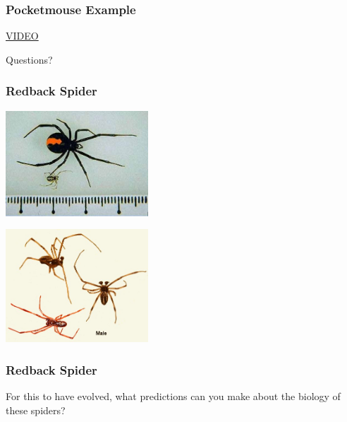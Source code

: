\documentclass[10pt]{beamer}
\begin{document}
\begin{frame}
\frametitle{Pocketmouse Example}

	\begin{center}
		\href{https://www.youtube.com/watch?v=sjeSEngKGrg}{\LARGE{VIDEO}}
	\end{center}
\end{frame}


\begin{frame}
	\begin{center}
		\textcolor{myblue}{\LARGE{Questions?}}
	\end{center}	
\end{frame}    


\begin{frame}
\frametitle{Redback Spider}

	\begin{center}
		\includegraphics[width=0.4\textwidth]{figures/redback1.jpg}\\
		
		\vspace{0.5cm}
		
		\includegraphics[width=0.4\textwidth]{figures/redback2.jpg}\\
	\end{center}
\end{frame}


\begin{frame}[t]
\frametitle{Redback Spider}
\vspace{0.5cm}

	For this to have evolved, what predictions can you make about the biology of these spiders?
\end{frame}
\end{document}
